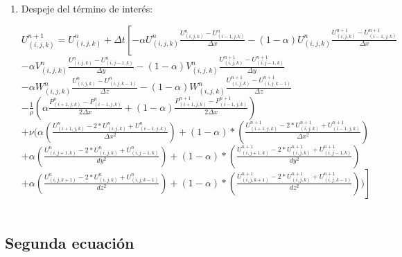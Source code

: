 \documentclass[a4paper]{article}
\begin{document}
\begin{enumerate}
\item Despeje del término de interés:

$ {U}^{n+1}_{(i,j,k)} = U^{n}_{(i,j,k)} + \Delta t \left[ -  \alpha {U}^{n}_{(i,j,k)} \frac{ {U}^{n}_{(i,j,k)} - U^{n}_{(i-1,j,k)}}{ \Delta x} - (1 - \alpha) {U}^{n}_{(i,j,k)} \frac{ {U}^{n+1}_{(i,j,k)} - U^{n+1}_{(i-1,j,k)}}{ \Delta x} \right.$ 
\\
$- \alpha {V}^{n}_{(i,j,k)} \frac{ {U}^{n}_{(i,j,k)} - U^{n}_{(i,j-1,k)}}{ \Delta y} - (1 - \alpha) {V}^{n}_{(i,j,k)} \frac{ {U}^{n+1}_{(i,j,k)} - U^{n+1}_{(i,j-1,k)}}{ \Delta y}$
\\
$- \alpha {W}^{n}_{(i,j,k)} \frac{ {U}^{n}_{(i,j,k)} - U^{n}_{(i,j,k-1)}}{ \Delta z} - (1 - \alpha) {W}^{n}_{(i,j,k)} \frac{ {U}^{n+1}_{(i,j,k)} - U^{n+1}_{(i,j,k-1)}}{ \Delta z}$
\\
$- \frac{1}{\rho} ( \alpha \frac{P^{n}_{(i+1,j,k)} - P^{n}_{(i-1,j,k)} }{ 2 \Delta x } + (1 - \alpha) \frac{P^{n+1}_{(i+1,j,k)} - P^{n+1}_{(i-1,j,k)} }{ 2 \Delta x })  $
\\
$+ \nu (\alpha (\frac{ U^{n}_{(i+1,j,k)} - 2*U^{n}_{(i,j,k)} + U^{n}_{(i-1,j,k)}}{\Delta x^2}) + (1-\alpha)*(\frac{ U^{n+1}_{(i+1,j,k)} - 2*U^{n+1}_{(i,j,k)} + U^{n+1}_{(i-1,j,k)}}{\Delta x^2})$
\\
$+ \alpha (\frac{ U^{n}_{(i,j+1,k)} - 2*U^{n}_{(i,j,k)} + U^{n}_{(i,j-1,k)}}{dy^2}) + (1-\alpha)*(\frac{ U^{n+1}_{(i,j+1,k)} - 2*U^{n+1}_{(i,j,k)} + U^{n+1}_{(i,j-1,k)}}{dy^2})$
\\
$ \left.+ \alpha (\frac{ U^{n}_{(i,j,k+1)} - 2*U^{n}_{(i,j,k)} + U^{n}_{(i,j,k-1)}}{dz^2}) + (1-\alpha)*(\frac{ U^{n+1}_{(i,j,k+1)} - 2*U^{n+1}_{(i,j,k)} + U^{n+1}_{(i,j,k-1)}}{dz^2})) \right]$
~\\


\end{enumerate}



\subsection{Segunda ecuación}
\end{document}

